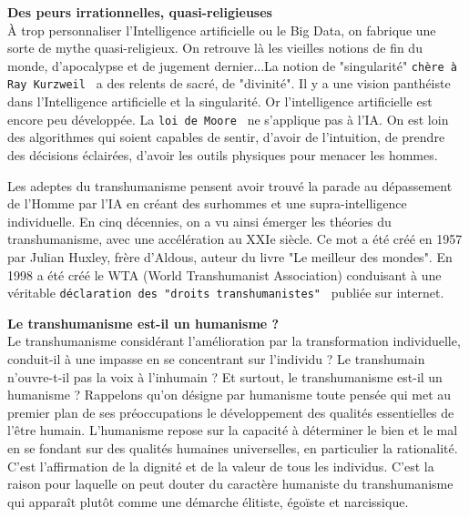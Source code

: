 \documentclass[11pt,twoside,a4paper]{article}
\begin{document}
\textbf{Des peurs irrationnelles, quasi-religieuses}~\\

{\`A} trop personnaliser l'Intelligence artificielle ou le Big Data, on fabrique une sorte de mythe quasi-religieux. On retrouve l{\`a} les vieilles notions de fin du monde, d'apocalypse et de jugement dernier...La notion de "singularit{\'e}" \texttt{ch{\`e}re {\`a} Ray Kurzweil~\footnotemark} a des relents de sacr{\'e}, de "divinit{\'e}". Il y a une vision panth{\'e}iste dans l'Intelligence artificielle et la singularit{\'e}. Or l'intelligence artificielle est encore peu d{\'e}velopp{\'e}e. La \texttt{loi de Moore~\footnotemark} ne s'applique pas {\`a} l'IA. On est loin des algorithmes qui soient capables de sentir, d'avoir de l'intuition, de prendre des d{\'e}cisions {\'e}clair{\'e}es, d'avoir les outils physiques pour menacer les hommes. ~\\

Les adeptes du transhumanisme pensent avoir trouv{\'e} la parade au d{\'e}passement de l'Homme par l'IA en cr{\'e}ant des surhommes et une supra-intelligence individuelle. En cinq d{\'e}cennies, on a vu ainsi {\'e}merger les th{\'e}ories du transhumanisme, avec une acc{\'e}l{\'e}ration au XXIe si{\`e}cle. Ce mot a {\'e}t{\'e} cr{\'e}{\'e} en 1957 par Julian Huxley, fr{\`e}re d'Aldous, auteur du livre "Le meilleur des mondes". En 1998 a {\'e}t{\'e} cr{\'e}{\'e} le WTA (World Transhumanist Association) conduisant {\`a} une v{\'e}ritable \texttt{d{\'e}claration des "droits transhumanistes"~\footnotemark} publi{\'e}e sur internet. ~\\

\textbf{Le transhumanisme est-il un humanisme ?}~\\

Le transhumanisme consid{\'e}rant l'am{\'e}lioration par la transformation individuelle, conduit-il {\`a} une impasse en se concentrant sur l'individu ? Le transhumain n'ouvre-t-il pas la voix {\`a} l'inhumain ? Et surtout, le transhumanisme est-il un humanisme ? Rappelons qu'on d{\'e}signe par humanisme toute pens{\'e}e qui met au premier plan de ses pr{\'e}occupations le d{\'e}veloppement des qualit{\'e}s essentielles de l'{\^e}tre humain. L'humanisme repose sur la capacit{\'e} {\`a} d{\'e}terminer le bien et le mal en se fondant sur des qualit{\'e}s humaines universelles, en particulier la rationalit{\'e}. C'est l'affirmation de la dignit{\'e} et de la valeur de tous les individus. C'est la raison pour laquelle on peut douter du caract{\`e}re humaniste du transhumanisme qui appara{\^i}t plut{\^o}t comme une d{\'e}marche {\'e}litiste, {\'e}go{\"i}ste et narcissique. ~\\
\end{document}
